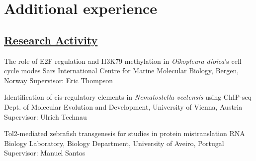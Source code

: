 \documentclass[11pt,a4paper,roman]{moderncv} %
\begin{document}

\section{Additional experience}

    \subsection{\underline{Research Activity}}

            {The role of E2F regulation and H3K79 methylation in \textit{Oikopleura dioica}'s cell cycle modes}
            {Sars International Centre for Marine Molecular Biology, Bergen, Norway}{}
            {}
            {Supervisor: Eric Thompson}

            {Identification of cis-regulatory elements in \textit{Nematostella vectensis} using ChIP-seq}
            {Dept. of Molecular Evolution and Development, University of Vienna, Austria}{}
            {}
            {Supervisor: Ulrich Technau}

            {Tol2-mediated zebrafish transgenesis for studies in protein mistranslation}
            {RNA Biology Laboratory, Biology Department, University of Aveiro, Portugal}{}
            {}
            {Supervisor: Manuel Santos}
\end{document}

